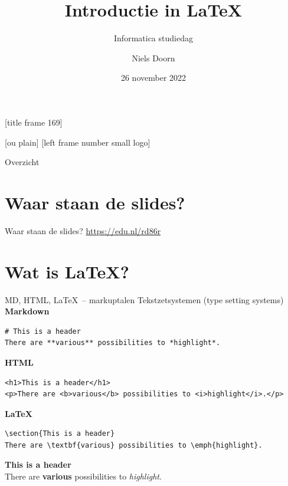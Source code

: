 \documentclass[aspectratio=169]{beamer}
\title{Introductie in \LaTeX}
\subtitle{Informatica studiedag}
\author{Niels Doorn}
\date{26 november 2022}
\begin{document}
[title frame 169]
\begin{frame}
  \titlepage
\end{frame}

[ou plain]
[left frame number small logo]

\begin{frame}{Overzicht}
\tableofcontents[hideallsubsections]
\end{frame}


\section{Waar staan de slides?}
\begin{frame}[fragile]{Waar staan de slides?}
\href{https://edu.nl/rd86r}{https://edu.nl/rd86r}
\end{frame}


\section{Wat is \LaTeX?}

\begin{frame}[fragile]{MD, HTML, \LaTeX\ -- markuptalen}
Tekstzetsystemen (type setting systems)
\pause
\\
\textbf{Markdown}
\begin{verbatim}
# This is a header
There are **various** possibilities to *highlight*.
\end{verbatim}
\pause
\textbf{HTML}
\begin{verbatim}
<h1>This is a header</h1>
<p>There are <b>various</b> possibilities to <i>highlight</i>.</p>
\end{verbatim}
\pause
\textbf{\LaTeX}
\begin{verbatim}
\section{This is a header}
There are \textbf{various} possibilities to \emph{highlight}.
\end{verbatim}
\pause
\begin{tcolorbox}
 {\Large {\bf This is a header}}\\
 There are \textbf{various} possibilities to \emph{highlight}.
\end{tcolorbox}

\end{frame}
\end{document}
